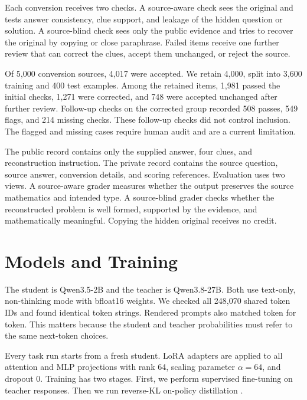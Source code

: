 \documentclass[11pt]{article}
\begin{document}
Each conversion receives two checks. A source-aware check sees the original and tests answer consistency, clue support, and leakage of the hidden question or solution. A source-blind check sees only the public evidence and tries to recover the original by copying or close paraphrase. Failed items receive one further review that can correct the clues, accept them unchanged, or reject the source.

Of 5,000 conversion sources, 4,017 were accepted. We retain 4,000, split into 3,600 training and 400 test examples. Among the retained items, 1,981 passed the initial checks, 1,271 were corrected, and 748 were accepted unchanged after further review. Follow-up checks on the corrected group recorded 508 passes, 549 flags, and 214 missing checks. These follow-up checks did not control inclusion. The flagged and missing cases require human audit and are a current limitation.

The public record contains only the supplied answer, four clues, and reconstruction instruction. The private record contains the source question, source answer, conversion details, and scoring references. Evaluation uses two views. A source-aware grader measures whether the output preserves the source mathematics and intended type. A source-blind grader checks whether the reconstructed problem is well formed, supported by the evidence, and mathematically meaningful. Copying the hidden original receives no credit.

\section{Models and Training}

The student is Qwen3.5-2B and the teacher is Qwen3.8-27B. Both use text-only, non-thinking mode with bfloat16 weights. We checked all 248,070 shared token IDs and found identical token strings. Rendered prompts also matched token for token. This matters because the student and teacher probabilities must refer to the same next-token choices.

Every task run starts from a fresh student. LoRA adapters are applied to all attention and MLP projections with rank 64, scaling parameter $\alpha=64$, and dropout 0. Training has two stages. First, we perform supervised fine-tuning on teacher responses. Then we run reverse-KL on-policy distillation \citep{agarwal2024opd}.
\end{document}
